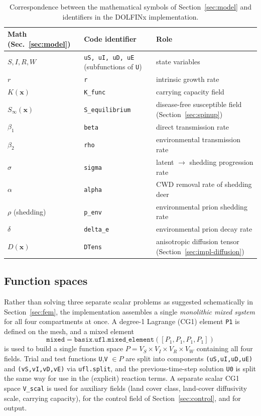 \documentclass[11pt]{article}
\begin{document}
\begin{table}[h]
\centering
\caption{Correspondence between the mathematical symbols of Section~\ref{sec:model} and identifiers in the DOLFINx implementation.}
\label{tab:code-notation}
\begin{tabular}{@{}lll@{}}
\toprule
Math (Sec.~\ref{sec:model}) & Code identifier & Role \\
\midrule
$S,I,R,W$ & \texttt{uS, uI, uD, uE} (subfunctions of \texttt{U}) & state variables \\
$r$ & \texttt{r} & intrinsic growth rate \\
$K(\mathbf{x})$ & \texttt{K\_func} & carrying capacity field \\
$S_\infty(\mathbf{x})$ & \texttt{S\_equilibrium} & disease-free susceptible field (Section~\ref{sec:spinup}) \\
$\beta_1$ & \texttt{beta} & direct transmission rate \\
$\beta_2$ & \texttt{rho} & environmental transmission rate \\
$\sigma$ & \texttt{sigma} & latent $\to$ shedding progression rate \\
$\alpha$ & \texttt{alpha} & CWD removal rate of shedding deer \\
$\rho$ (shedding) & \texttt{p\_env} & environmental prion shedding rate \\
$\delta$ & \texttt{delta\_e} & environmental prion decay rate \\
$D(\mathbf{x})$ & \texttt{DTens} & anisotropic diffusion tensor (Section~\ref{sec:impl-diffusion}) \\
\bottomrule
\end{tabular}
\end{table}

\subsection{Function spaces}

Rather than solving three separate scalar problems as suggested schematically in Section~\ref{sec:fem}, the implementation assembles a single \emph{monolithic mixed system} for all four compartments at once. A degree-1 Lagrange (CG1) element \texttt{P1} is defined on the mesh, and a mixed element
\[
\texttt{mixed} = \texttt{basix.ufl.mixed\_element}([P_1,P_1,P_1,P_1])
\]
is used to build a single function space $P = V_S \times V_I \times V_R \times V_W$ containing all four fields. Trial and test functions \texttt{U},\texttt{V} $\in P$ are split into components \texttt{(uS,uI,uD,uE)} and \texttt{(vS,vI,vD,vE)} via \texttt{ufl.split}, and the previous-time-step solution \texttt{U0} is split the same way for use in the (explicit) reaction terms. A separate scalar CG1 space \texttt{V\_scal} is used for auxiliary fields (land cover class, land-cover diffusivity scale, carrying capacity), for the control field of Section~\ref{sec:control}, and for output.
\end{document}
